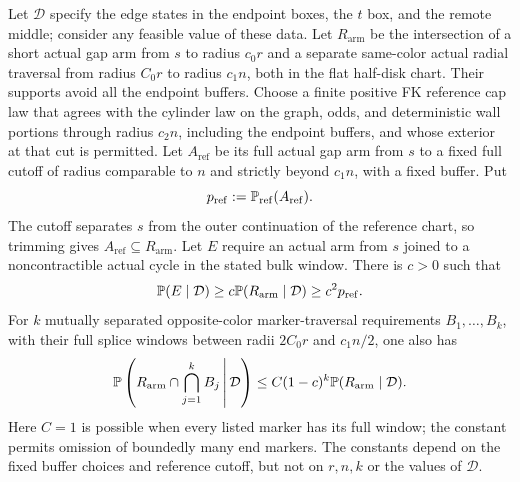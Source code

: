 \begin{corollary}
Let $\mathcal D$ specify the edge states in the endpoint boxes, the
$t$ box, and the remote middle; consider any feasible value of these
data. Let $R_{\mathrm{arm}}$ be the intersection of a short actual
gap arm from $s$ to radius $c_0r$ and a separate same-color actual
radial traversal from radius $C_0r$ to radius $c_1n$, both in the
flat half-disk chart. Their supports avoid all the endpoint buffers.
Choose a finite positive FK reference cap law that agrees with the
cylinder law on the graph, odds, and deterministic wall portions
through radius $c_2n$, including the endpoint buffers, and whose
exterior at that cut is permitted. Let $A_{\mathrm{ref}}$ be its full
actual gap arm from $s$ to a fixed full cutoff of radius comparable
to $n$ and strictly beyond $c_1n$, with a fixed buffer. Put
\[
 p_{\mathrm{ref}}:=\mathbb P_{\mathrm{ref}}(A_{\mathrm{ref}}).
\]
The cutoff separates $s$ from the outer continuation of the reference
chart, so trimming gives $A_{\mathrm{ref}}\subseteq R_{\mathrm{arm}}$.
Let $E$ require an actual arm from $s$ joined to a noncontractible
actual cycle in the stated bulk window. There is $c>0$ such that
\begin{equation}\label{disk:grouped-cycle-lower}
 \mathbb P(E\mid\mathcal D)
    \ge c\mathbb P(R_{\mathrm{arm}}\mid\mathcal D)
    \ge c^2 p_{\mathrm{ref}}.
\end{equation}
For $k$ mutually separated opposite-color marker-traversal
requirements $B_1,\ldots,B_k$, with their full splice windows
between radii $2C_0r$ and $c_1n/2$, one also has
\begin{equation}\label{disk:grouped-marker-upper}
 \mathbb P\left(R_{\mathrm{arm}}\cap
                  \bigcap_{j=1}^k B_j\,\middle|\,\mathcal D\right)
 \le C(1-c)^k\mathbb P(R_{\mathrm{arm}}\mid\mathcal D).
\end{equation}
Here $C=1$ is possible when every listed marker has its full
window; the constant permits omission of boundedly many end
markers. The constants depend on the fixed buffer choices and
reference cutoff, but not on $r,n,k$ or the values of $\mathcal D$.
\end{corollary}

